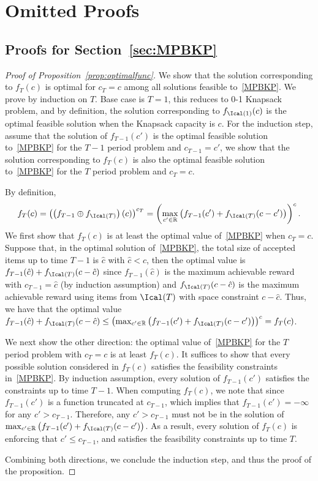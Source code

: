\section{Omitted Proofs}\label{Appb}

\subsection{Proofs for Section~\ref{sec:MPBKP}}
\begin{proof}[Proof of Proposition~\ref{prop:optimalfunc}]
	We show that the solution corresponding to $f_T(c)$ is optimal for $c_T=c$ among all solutions feasible to~\eqref{MPBKP}. We prove by induction on $T$. Base case is $T=1$, this reduces to 0-1 Knapsack problem, and by definition, the solution corresponding to $f_{\Ical(1)}(c)$ is the optimal feasible solution when the Knapsack capacity is $c$. For the induction step, assume that the solution of $f_{T-1}(c')$ is the optimal feasible solution to~\eqref{MPBKP} for the $T-1$ period problem and $c_{T-1}=c'$, we show that the solution corresponding to $f_{T}(c)$ is also the optimal feasible solution to~\eqref{MPBKP} for the $T$ period problem and $c_{T}=c$. 
	
	By definition, $$f_{T}(c) = \left(\left(f_{T-1}\oplus f_{\Ical(T)}\right)(c)\right)^{c_{T}} = \left(\max_{c'\in\mathbb{R}}\left(f_{T-1}(c')+f_{\Ical(T)}(c-c')\right)\right)^{c}.$$ We first show that $f_T(c)$ is at least the optimal value of~\eqref{MPBKP} when $c_T=c$. Suppose that, in the optimal solution of~\eqref{MPBKP}, the total size of accepted items up to time $T-1$ is $\hat{c}$ with $\hat{c}<c$, then the optimal value is $f_{T-1}(\hat{c})+f_{\Ical(T)}(c-\hat{c})$ since $f_{T-1}(\hat{c})$ is the maximum achievable reward with $c_{T-1}=\hat{c}$ (by induction assumption) and $f_{\Ical(T)}(c-\hat{c})$ is the maximum achievable reward using items from $\Ical(T)$ with space constraint $c-\hat{c}$. Thus, we have that the optimal value $f_{T-1}(\hat{c})+f_{\Ical(T)}(c-\hat{c})\le \left(\max_{c'\in\mathbb{R}}\left(f_{T-1}(c')+f_{\Ical(T)}(c-c')\right)\right)^c=f_T(c)$. 
	
	We next show the other direction: the optimal value of~\eqref{MPBKP} for the $T$ period problem with $c_T=c$ is at least $f_T(c)$. It suffices to show that every possible solution considered in $f_T(c)$ satisfies the feasibility constraints in~\eqref{MPBKP}. By induction assumption, every solution of $f_{T-1}(c')$ satisfies the constraints up to time $T-1$. When computing $f_T(c)$, we note that since $f_{T-1}(c')$ is a function truncated at $c_{T-1}$, which implies that $f_{T-1}(c')=-\infty$ for any $c'>c_{T-1}$. Therefore, any $c'>c_{T-1}$ must not be in the solution of $\max_{c'\in\mathbb{R}}\left(f_{T-1}(c')+f_{\Ical(T)}(c-c')\right)$. As a result, every solution of $f_T(c)$ is enforcing that ${c'}\le c_{T-1}$, and satisfies the feasibility constraints up to time $T$.
	
	Combining both directions, we conclude the induction step, and thus the proof of the proposition. 
\end{proof}


